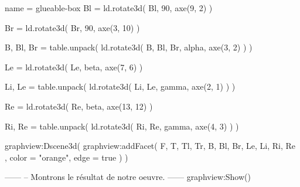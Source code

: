 \documentclass[border = 3pt]{standalone}
\begin{document}
\begin{luadraw*}{name = glueable-box}
Bl = ld.rotate3d(
  Bl,
  90, axe(9, 2)
)

Br = ld.rotate3d(
  Br,
  90, axe(3, 10)
)

B, Bl, Br = table.unpack(
  ld.rotate3d(
    {B, Bl, Br},
    alpha, axe(3, 2)
  )
)

Le = ld.rotate3d(
  Le,
  beta, axe(7, 6)
)

Li, Le = table.unpack(
  ld.rotate3d(
    {Li, Le},
    gamma, axe(2, 1)
  )
)

Re = ld.rotate3d(
  Re,
  beta, axe(13, 12)
)

Ri, Re = table.unpack(
  ld.rotate3d(
    {Ri, Re},
    gamma, axe(4, 3)
  )
)

graphview:Dscene3d(
  graphview:addFacet(
    {
      F,
      T, Tl, Tr,
      B, Bl, Br,
      Le, Li,
      Ri, Re
    },
    {
      color = "orange",
      edge  = true
    }
  )
)

------
-- Montrons le résultat de notre oeuvre.
------
graphview:Show()
\end{luadraw*}
\end{document}
